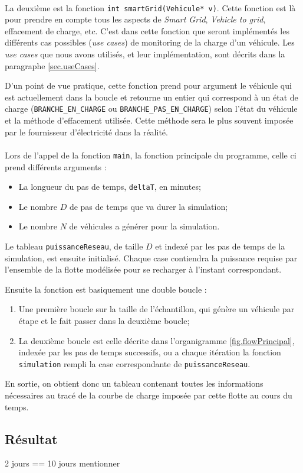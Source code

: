 			\paragraph{}La deuxième est la fonction \texttt{int smartGrid(Vehicule* v)}. Cette fonction est là pour prendre en compte tous les aspects de \emph{Smart Grid}, \emph{Vehicle to grid}, effacement de charge, etc. C'est dans cette fonction que seront implémentés les différents cas possibles (\emph{use cases}) de monitoring de la charge d'un véhicule. Les \emph{use cases} que nous avons utilisés, et leur implémentation, sont décrits dans la paragraphe \ref{sec.useCases}. 
			
			D'un point de vue pratique, cette fonction prend pour argument le véhicule qui est actuellement dans la boucle et retourne un entier qui correspond à un état de charge (\texttt{BRANCHE_EN_CHARGE} ou \texttt{BRANCHE_PAS_EN_CHARGE}) selon l'état du véhicule et la méthode d'effacement utilisée. Cette méthode sera le plus souvent imposée par le fournisseur d’électricité dans la réalité.
			
			\paragraph{} Lors de l'appel de la fonction \texttt{main}, la fonction principale du programme, celle ci prend différents arguments :
			\begin{itemize}
			\item La longueur du pas de temps, \texttt{deltaT}, en minutes;
			\item Le nombre $D$ de pas de temps que va durer la simulation;
			\item Le nombre $N$ de véhicules a générer pour la simulation.
			\end{itemize}
			
			Le tableau \texttt{puissanceReseau}, de taille $D$  et indexé par les pas de temps de la simulation, est ensuite initialisé. Chaque case contiendra la puissance requise par l'ensemble de la flotte modélisée pour se recharger à l'instant correspondant.
			
			Ensuite la fonction est basiquement une double boucle :
			\begin{enumerate}
			\item Une première boucle sur la taille de l'échantillon, qui génère un véhicule par étape et le fait passer dans la deuxième boucle;
			\item La deuxième boucle est celle décrite dans l'organigramme \ref{fig.flowPrincipal}, indexée par les pas de temps successifs, ou a chaque itération la fonction \texttt{simulation} rempli la case correspondante de \texttt{puissanceReseau}.
			\end{enumerate}
			
			En sortie, on obtient donc un tableau contenant toutes les informations nécessaires au tracé de la courbe de charge imposée par cette flotte au cours du temps.
		
		
		\clearpage
	\subsection{Résultat}

2 jours == 10 jours mentionner